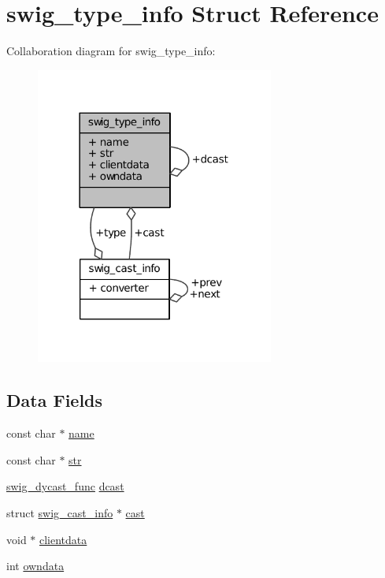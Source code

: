 \hypertarget{structswig__type__info}{\section{swig\-\_\-type\-\_\-info Struct Reference}
\label{structswig__type__info}
}


Collaboration diagram for swig\-\_\-type\-\_\-info\-:
\nopagebreak
\begin{figure}[H]
\begin{center}
\leavevmode
\includegraphics[width=222pt]{structswig__type__info__coll__graph}
\end{center}
\end{figure}
\subsection*{Data Fields}
\begin{DoxyCompactItemize}
\item 
const char $\ast$ \hyperlink{structswig__type__info_a8f8f80d37794cde9472343e4487ba3eb}{name}
\item 
const char $\ast$ \hyperlink{structswig__type__info_af25d6dc49269fa2003ac7c7fa6f13915}{str}
\item 
\hyperlink{libntoh_p_y_t_h_o_n__wrap_8c_ad9f16e529633c78df7a780b9749395ce}{swig\-\_\-dycast\-\_\-func} \hyperlink{structswig__type__info_af97c463eb56e4061bd472750f8f501d3}{dcast}
\item 
struct \hyperlink{structswig__cast__info}{swig\-\_\-cast\-\_\-info} $\ast$ \hyperlink{structswig__type__info_aed90935b91e98b8de705d24f1b6facb0}{cast}
\item 
void $\ast$ \hyperlink{structswig__type__info_ae60177f52d83fcd32268d79f2aa8012f}{clientdata}
\item 
int \hyperlink{structswig__type__info_a25f6d5be66f731f527b185e361b06509}{owndata}
\end{DoxyCompactItemize}


